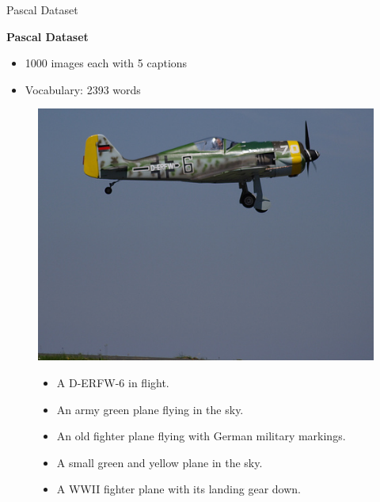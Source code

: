 \documentclass[8pt]{beamer}
\begin{document}
\begin{frame}{Pascal Dataset}

  \textbf{Pascal Dataset}
  \begin{itemize}
  \item 1000 images each with 5 captions
  \item Vocabulary: 2393 words    
  \end{itemize}

\vspace{4ex}

\begin{figure}[T]
  \begin{minipage}{0.45\linewidth}
    \centering
    \includegraphics[width=.8\textwidth]{figures/img_3.jpg}
  \end{minipage}
  \begin{minipage}[t]{0.45\linewidth}
    \vspace{-10ex}
    \centering
    \footnotesize
    \begin{itemize}
    \item A D-ERFW-6 in flight.
    \item An army green plane flying in the sky.
    \item An old fighter plane flying with German military markings.
    \item A small green and yellow plane in the sky.
    \item A WWII fighter plane with its landing gear down.
    \end{itemize}
  \end{minipage}
\end{figure}



\end{frame}
\end{document}
